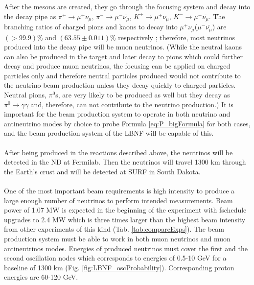 After the mesons are created, they go through the focusing system and decay into the decay pipe as $\pi^+ \rightarrow \mu^+\nu_\mu$, $\pi^- \rightarrow \mu^-\bar{\nu_\mu}$, $K^+ \rightarrow \mu^+\nu_\mu$, $K^- \rightarrow \mu^-\bar{\nu_\mu}$. The branching ratios of charged pions and kaons to decay into $\mu^+\nu_\mu$($\mu^-\bar{\nu_\mu}$) are $(>99.9)\%$ and $(63.55\pm0.011)\%$ respectively \cite{ref_PDG}; therefore, most neutrinos produced into the decay pipe will be muon neutrinos. (While the neutral kaons can also be produced in the target and later decay to pions which could further decay and produce muon neutrinos, the focusing can be applied on charged particles only and therefore neutral particles produced would not contribute to the neutrino beam production unless they decay quickly to charged particles. Neutral pions, $\pi^0$s, are very likely to be produced as well but they decay as $\pi^0 \rightarrow \gamma\gamma$ and, therefore, can not contribute to the neutrino production.) It is important for the beam production system to operate in both neutrino and antineutrino modes by choice to probe Formula \ref{eq:P_bigFormula} for both cases, and the beam production system of the LBNF will be capable of this.\\ \\
After being produced in the reactions described above, the neutrinos will be detected in the ND at Fermilab. Then the neutrinos will travel 1300 km through the Earth's crust and will be detected at SURF in South Dakota.\\  \\
One of the most important beam requirements is high intensity to produce a large enough number of neutrinos to perform intended measurements. Beam power of 1.07 MW is expected in the beginning of the experiment with fschedule upgrades to 2.4 MW which is three times larger than the highest beam intensity from other experiments of this kind (Tab. \ref{tab:compareExps}). The beam production system must be able to work in both muon neutrinos and muon antineutrinos modes. Energies of produced neutrinos must cover the first and the second oscillation nodes which corresponds to energies of 0.5-10 GeV for a baseline of 1300 km (Fig. \ref{fig:LBNF_oscProbability}). Corresponding proton energies are 60-120 GeV.\\ \\
